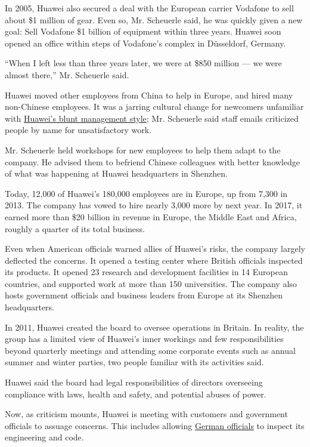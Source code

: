 In 2005, Huawei also secured a deal with the European carrier Vodafone
to sell about \$1 million of gear. Even so, Mr. Scheuerle said, he was
quickly given a new goal: Sell Vodafone \$1 billion of equipment within
three years. Huawei soon opened an office within steps of Vodafone's
complex in Düsseldorf, Germany.

``When I left less than three years later, we were at \$850 million ---
we were almost there,'' Mr. Scheuerle said.

Huawei moved other employees from China to help in Europe, and hired
many non-Chinese employees. It was a jarring cultural change for
newcomers unfamiliar with
\href{https://www.nytimes.com/2018/12/18/technology/huawei-workers-iran-sanctions.html}{Huawei's
blunt management style}; Mr. Scheuerle said staff emails criticized
people by name for unsatisfactory work.

Mr. Scheuerle held workshops for new employees to help them adapt to the
company. He advised them to befriend Chinese colleagues with better
knowledge of what was happening at Huawei headquarters in Shenzhen.

Today, 12,000 of Huawei's 180,000 employees are in Europe, up from 7,300
in 2013. The company has vowed to hire nearly 3,000 more by next year.
In 2017, it earned more than \$20 billion in revenue in Europe, the
Middle East and Africa, roughly a quarter of its total business.

Even when American officials warned allies of Huawei's risks, the
company largely deflected the concerns. It opened a testing center where
British officials inspected its products. It opened 23 research and
development facilities in 14 European countries, and supported work at
more than 150 universities. The company also hosts government officials
and business leaders from Europe at its Shenzhen headquarters.

In 2011, Huawei created the board to oversee operations in Britain. In
reality, the group has a limited view of Huawei's inner workings and few
responsibilities beyond quarterly meetings and attending some corporate
events such as annual summer and winter parties, two people familiar
with its activities said.

Huawei said the board had legal responsibilities of directors overseeing
compliance with laws, health and safety, and potential abuses of power.

Now, as criticism mounts, Huawei is meeting with customers and
government officials to assuage concerns. This includes allowing
\href{https://www.huawei.eu/media-centre/press-releases/huawei-opens-security-innovation-lab-bonn}{German
officials} to inspect its engineering and code.

